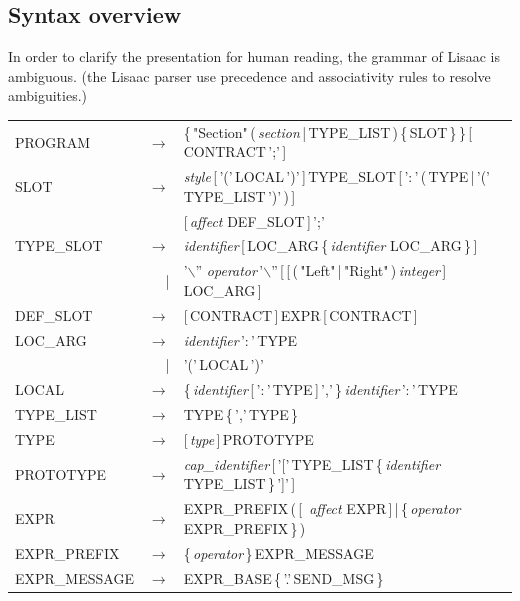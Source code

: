 \documentclass[11pt]{mybook}
\begin{document}
\subsection{Syntax overview}
\label{language_reference:lexical_syntax:syntax}
%
In order to clarify the presentation for human reading, the
grammar of Lisaac is ambiguous. (the Lisaac parser use
precedence and associativity rules to resolve ambiguities.)\\
\noindent
{\tt\begin{tabular}{lrl}
PROGRAM       & $\rightarrow$ & \{\,"Section"\,(\,{\it{}section}\,|\,TYPE\_LIST\,)\,\{\,SLOT\,\}\,\}\,[\,CONTRACT\,';'\,]\\ 
SLOT          & $\rightarrow$ & {\it{}style}\,[\,'('\,LOCAL\,')'\,]\,TYPE\_SLOT\,[\,'$\colon$'\,(\,TYPE\,|\,'('\,TYPE\_LIST\,')'\,)\,]\\
              &               & [\,{\it{}affect} DEF\_SLOT\,]\,';'\\
TYPE\_SLOT    & $\rightarrow$ & {\it{}identifier}\,[\,LOC\_ARG\,\{\,{\it{}identifier} LOC\_ARG\,\}\,]\\
              & |             & '$\backslash$''\,{\,\it{}operator}\,'$\backslash$''\,[\,[\,(\,"Left"\,|\,"Right"\,)\,{\it{}integer}\,]\,LOC\_ARG\,]\\
DEF\_SLOT     & $\rightarrow$ & [\,CONTRACT\,]\,EXPR\,[\,CONTRACT\,]\\
LOC\_ARG      & $\rightarrow$ & {\it{}identifier}\,'$\colon$'\,TYPE\\
              & |             & '('\,LOCAL\,')'\\
LOCAL         & $\rightarrow$ & \{\,{\it{}identifier}\,[\,'$\colon$'\,TYPE\,]\,','\,\}\,{\it{}identifier}\,'$\colon$'\,TYPE\\
TYPE\_LIST    & $\rightarrow$ & TYPE\,\{\,','\,TYPE\,\}\\
TYPE          & $\rightarrow$ & [\,{\it{}type}\,]\,PROTOTYPE\\
PROTOTYPE     & $\rightarrow$ & {\it{}cap\_identifier}\,[\,'['\,TYPE\_LIST\,\{\,{\it{}identifier} TYPE\_LIST\,\}\,']'\,]\\
EXPR          & $\rightarrow$ & EXPR\_PREFIX\,(\,[\,{\it{} affect} EXPR\,]\,|\,\{\,{\it{}operator} EXPR\_PREFIX\,\}\,)\\
EXPR\_PREFIX  & $\rightarrow$ & \{\,{\it{}operator}\,\}\,EXPR\_MESSAGE\\
EXPR\_MESSAGE & $\rightarrow$ & EXPR\_BASE\,\{\,'.'\,SEND\_MSG\,\}\\

\end{tabular}}
\end{document}
